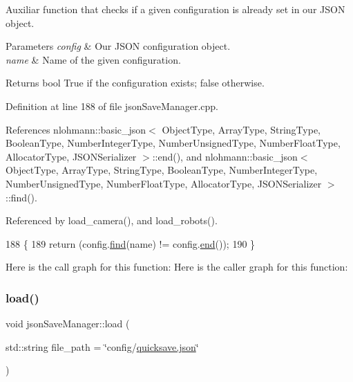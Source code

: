 Auxiliar function that checks if a given configuration is already set in our J\+S\+ON object. 


\begin{DoxyParams}{Parameters}
{\em config} & Our J\+S\+ON configuration object. \\
\hline
{\em name} & Name of the given configuration. \\
\hline
\end{DoxyParams}
\begin{DoxyReturn}{Returns}
bool True if the configuration exists; false otherwise. 
\end{DoxyReturn}


Definition at line 188 of file json\+Save\+Manager.\+cpp.



References nlohmann\+::basic\+\_\+json$<$ Object\+Type, Array\+Type, String\+Type, Boolean\+Type, Number\+Integer\+Type, Number\+Unsigned\+Type, Number\+Float\+Type, Allocator\+Type, J\+S\+O\+N\+Serializer $>$\+::end(), and nlohmann\+::basic\+\_\+json$<$ Object\+Type, Array\+Type, String\+Type, Boolean\+Type, Number\+Integer\+Type, Number\+Unsigned\+Type, Number\+Float\+Type, Allocator\+Type, J\+S\+O\+N\+Serializer $>$\+::find().



Referenced by load\+\_\+camera(), and load\+\_\+robots().


\begin{DoxyCode}
188                                                       \{
189     \textcolor{keywordflow}{return} (config.\hyperlink{classnlohmann_1_1basic__json_a89eb3928f57903677051c80534be9cb1}{find}(name) != config.\hyperlink{classnlohmann_1_1basic__json_a13e032a02a7fd8a93fdddc2fcbc4763c}{end}());
190 \}
\end{DoxyCode}
Here is the call graph for this function\+:
Here is the caller graph for this function\+:
\mbox{\label{classjson_save_manager_a79fd35c53290662b58c5a4869376fa2e}} 
\subsubsection{\texorpdfstring{load()}{load()}}
{\footnotesize\ttfamily void json\+Save\+Manager\+::load (\begin{DoxyParamCaption}\item[{std\+::string}]{file\+\_\+path = {\ttfamily \char`\"{}config/\hyperlink{json_save_manager_8h_ab701e3ac61a85b337ec5c1abaad6742d}{quicksave.\+json}\char`\"{}} }\end{DoxyParamCaption})}



